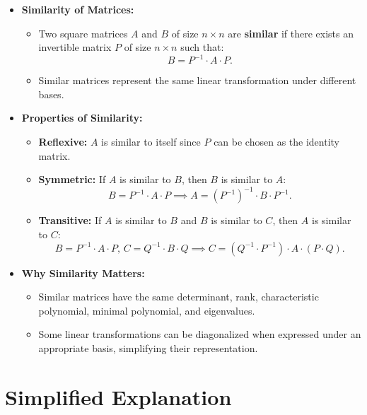 \documentclass{article}
\begin{document}
\begin{itemize}
  \item \textbf{Similarity of Matrices:}
    \begin{itemize}
      \item Two square matrices $A$ and $B$ of size $n \times n$ are \textbf{similar} if there exists an invertible matrix $P$ of size $n \times n$ such that:
        \[
          B = P^{-1} \cdot A \cdot P.
        \]
      \item Similar matrices represent the same linear transformation under different bases.
    \end{itemize}

  \item \textbf{Properties of Similarity:}
    \begin{itemize}
      \item \textbf{Reflexive:} $A$ is similar to itself since $P$ can be chosen as the identity matrix.
      \item \textbf{Symmetric:} If $A$ is similar to $B$, then $B$ is similar to $A$:
        \[
          B = P^{-1} \cdot A \cdot P \implies A = (P^{-1})^{-1} \cdot B \cdot P^{-1}.
        \]
      \item \textbf{Transitive:} If $A$ is similar to $B$ and $B$ is similar to $C$, then $A$ is similar to $C$:
        \[
          B = P^{-1} \cdot A \cdot P, \, C = Q^{-1} \cdot B \cdot Q \implies C = (Q^{-1} \cdot P^{-1}) \cdot A \cdot (P \cdot Q).
        \]
    \end{itemize}

  \item \textbf{Why Similarity Matters:}
    \begin{itemize}
      \item Similar matrices have the same determinant, rank, characteristic polynomial, minimal polynomial, and eigenvalues.
      \item Some linear transformations can be diagonalized when expressed under an appropriate basis, simplifying their representation.
    \end{itemize}
\end{itemize}

\section*{Simplified Explanation}
\end{document}
